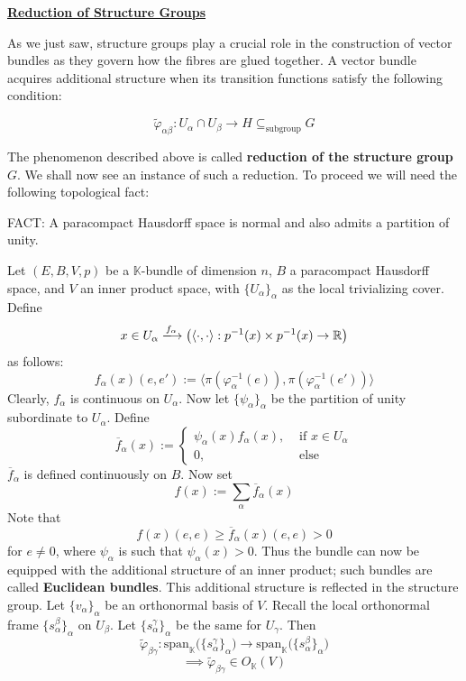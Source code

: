 \documentclass[11pt,a4paper]{article}
\begin{document}
\underline{\textbf{Reduction of Structure Groups}}

As we just saw, structure groups play a crucial role in the construction of vector bundles as they govern how the fibres are glued together. A vector bundle acquires additional structure when its transition functions satisfy the following condition:

$$\widetilde{\varphi}_{\alpha\beta}: U_{\alpha}\cap U_{\beta} \rightarrow H \subseteq_{\text{subgroup}} G$$

The phenomenon described above is called \textbf{reduction of the structure group $G$}. We shall now see an instance of such a reduction. To proceed we will need the following topological fact:

\begin{center}

FACT: A paracompact Hausdorff space is normal and also admits a partition of unity.

\end{center}


Let $(E, B, V, p)$ be a $\mathbb K$-bundle of dimension $n$, $B$ a paracompact Hausdorff space, and $V$ an inner product space, with $\{U_{\alpha}\}_{\alpha}$ as the local trivializing cover. Define
$$x\in U_{\alpha} \xlongrightarrow{f_{\alpha}} \big(\langle\cdot, \cdot\rangle: p^{-1}(x)\times p^{-1}(x) \rightarrow \mathbb{R}\big)$$
as follows:
$$f_{\alpha}(x)(e, e'):= \big\langle\pi(\varphi_{\alpha}^{-1}(e)), \pi(\varphi_{\alpha}^{-1}(e'))\big\rangle$$
Clearly, $f_{\alpha}$ is continuous on $U_{\alpha}$. Now let $\{\psi_{\alpha}\}_{\alpha}$ be the partition of unity subordinate to $U_{\alpha}$. Define
$$\overline{f}_{\alpha}(x):= \begin{cases}
\psi_{\alpha}(x)f_{\alpha}(x), & \text{ if } x \in U_{\alpha}\\
0, & \text{ else }
\end{cases}$$
$\overline{f}_{\alpha}$ is defined continuously on $B$. Now set
$$f(x):= \sum_{\alpha}{\overline{f}_{\alpha}(x)}$$
Note that
$$f(x)(e, e) \geq \overline{f}_{\alpha}(x)(e, e) >0$$
for $e\ne0$, where $\psi_{\alpha}$ is such that $\psi_{\alpha}(x) >0$. Thus the bundle can now be equipped with the additional structure of an inner product; such bundles are called \textbf{Euclidean bundles}. This additional structure is reflected in the structure group. Let $\{v_{\alpha}\}_{\alpha}$ be an orthonormal basis of $V$. Recall the local orthonormal frame $\{s_{\alpha}^{\beta}\}_{\alpha}$ on $U_{\beta}$. Let $\{s_{\alpha}^{\gamma}\}_{\alpha}$ be the same for $U_{\gamma}$. Then
$$\widetilde{\varphi}_{\beta\gamma}: \text{span}_{\mathbb{K}}\big(\{s_{\alpha}^{\gamma}\}_{\alpha})\rightarrow \text{span}_{\mathbb{K}}\big(\{s_{\alpha}^{\beta}\}_{\alpha})$$
$$\implies\widetilde{\varphi}_{\beta\gamma} \in O_{\mathbb{K}}(V)$$
\end{document}
